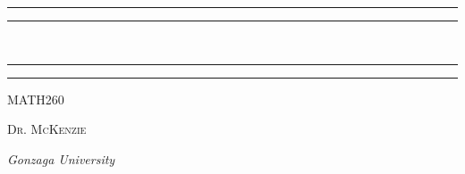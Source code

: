 \begin{titlepage}

  
  \centering %
      
  \scshape %
  
  \vspace*{\baselineskip} %
  
  
  \rule{\textwidth}{1.6pt}\vspace*{-\baselineskip}\vspace*{2pt} %
  \rule{\textwidth}{0.4pt} %
  
  \vspace{0.75\baselineskip} %
  {\huge {}\\} %
  
  \vspace{0.75\baselineskip} %
  
  \rule{\textwidth}{0.4pt}\vspace*{-\baselineskip}\vspace{3.2pt} %
  \rule{\textwidth}{1.6pt} %
  
  \vspace{2\baselineskip} %
  
  
  \LARGE{MATH260} 
  
  \vspace*{3\baselineskip} %
  
  
  
  \vspace{0.5\baselineskip} 
  
  {\scshape   \LARGE Dr. McKenzie\\ } %
  
  \vspace{0.2\baselineskip} 
  
  \textit{\Large Gonzaga University} 
  

\end{titlepage}
